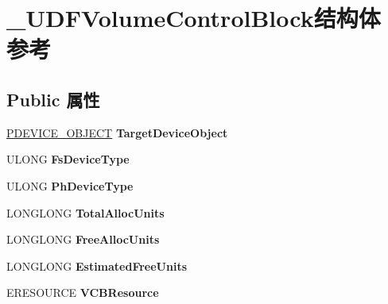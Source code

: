 \hypertarget{struct___u_d_f_volume_control_block}{}\section{\+\_\+\+U\+D\+F\+Volume\+Control\+Block结构体 参考}
\label{struct___u_d_f_volume_control_block}
\subsection*{Public 属性}
\begin{DoxyCompactItemize}
\item 
\mbox{\label{struct___u_d_f_volume_control_block_a22abd8c2dd75fbe792c8afda19ae60ce}} 
\hyperlink{struct___d_e_v_i_c_e___o_b_j_e_c_t}{P\+D\+E\+V\+I\+C\+E\+\_\+\+O\+B\+J\+E\+CT} {\bfseries Target\+Device\+Object}
\item 
\mbox{\label{struct___u_d_f_volume_control_block_a8c21fef2a0348a7a1356504f7f67c689}} 
U\+L\+O\+NG {\bfseries Fs\+Device\+Type}
\item 
\mbox{\label{struct___u_d_f_volume_control_block_a8a97c0f2dc2a60e6dadadfc192b04af9}} 
U\+L\+O\+NG {\bfseries Ph\+Device\+Type}
\item 
\mbox{\label{struct___u_d_f_volume_control_block_a089c0cb3c2f818b2c91d819829f013e3}} 
L\+O\+N\+G\+L\+O\+NG {\bfseries Total\+Alloc\+Units}
\item 
\mbox{\label{struct___u_d_f_volume_control_block_a9aeb44c6fd3a49a6025d0cff0a9aeed7}} 
L\+O\+N\+G\+L\+O\+NG {\bfseries Free\+Alloc\+Units}
\item 
\mbox{\label{struct___u_d_f_volume_control_block_ae559eb1ed2cad9b6148445355dc663cc}} 
L\+O\+N\+G\+L\+O\+NG {\bfseries Estimated\+Free\+Units}
\item 
\mbox{\label{struct___u_d_f_volume_control_block_a2ad8749f8b9e7487108d22233d8f81f4}} 
E\+R\+E\+S\+O\+U\+R\+CE {\bfseries V\+C\+B\+Resource}
\item 

\end{DoxyCompactItemize}
